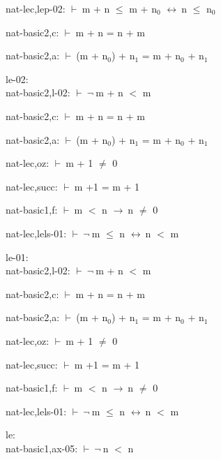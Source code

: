 \documentclass[a4paper]{article}
\newcommand{\Fol}{\mbox{$\vdash\ $}}
\newcommand{\Not}{\mbox{$\neg\ $}}
\newcommand{\Imp}{\mbox{$\rightarrow\ $}}
\newcommand{\Equiv}{\mbox{$\leftrightarrow\ $}}
\begin{document}
nat-lec,lep-02: 
 \Fol m + n $\le$ m + $\mbox{n}_{0}$ \Equiv n $\le$ $\mbox{n}_{0}$



nat-basic2,c: 
 \Fol m + n = n + m



nat-basic2,a: 
 \Fol (m + $\mbox{n}_{0}$) + $\mbox{n}_{1}$ = m + $\mbox{n}_{0}$ + $\mbox{n}_{1}$



\bigskip

le-02:\\ nat-basic2,l-02: 
 \Fol \Not m + n $<$ m



nat-basic2,c: 
 \Fol m + n = n + m



nat-basic2,a: 
 \Fol (m + $\mbox{n}_{0}$) + $\mbox{n}_{1}$ = m + $\mbox{n}_{0}$ + $\mbox{n}_{1}$



nat-lec,oz: 
 \Fol m + 1 $\neq$ 0



nat-lec,succ: 
 \Fol m +1 = m + 1



nat-basic1,f: 
 \Fol m $<$ n \Imp n $\neq$ 0



nat-lec,lels-01: 
 \Fol \Not m $\le$ n \Equiv n $<$ m



\bigskip

le-01:\\ nat-basic2,l-02: 
 \Fol \Not m + n $<$ m



nat-basic2,c: 
 \Fol m + n = n + m



nat-basic2,a: 
 \Fol (m + $\mbox{n}_{0}$) + $\mbox{n}_{1}$ = m + $\mbox{n}_{0}$ + $\mbox{n}_{1}$



nat-lec,oz: 
 \Fol m + 1 $\neq$ 0



nat-lec,succ: 
 \Fol m +1 = m + 1



nat-basic1,f: 
 \Fol m $<$ n \Imp n $\neq$ 0



nat-lec,lels-01: 
 \Fol \Not m $\le$ n \Equiv n $<$ m



\bigskip

le:\\ nat-basic1,ax-05: 
 \Fol \Not n $<$ n
\end{document}
